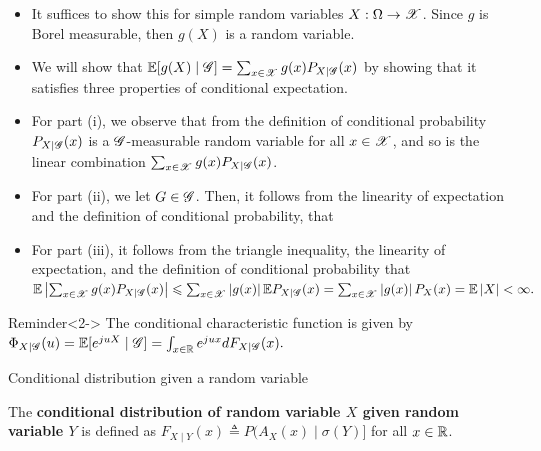 \documentclass[12pt,aspectratio=169]{beamer}
\begin{document}
\begin{frame}
\begin{Proof}
\begin{itemize}
\item <1-> It suffices to show this for simple random variables $X:\Omega\to\mathscr{X}$. 
Since $g$ is Borel measurable, then $g(X)$ is a random variable. 
\item <2-> We will show that $\mathbb{E}[g(X)\mid\mathscr{G}] = \sum_{x\in\mathscr{X}}g(x)P_{X\mid\mathscr{G}}(x)$ by showing that it satisfies three properties of conditional expectation.  
\item <3-> For part (i), we observe that from the definition of conditional probability $P_{X\mid\mathscr{G}}(x)$ is a $\mathscr{G}$-measurable random variable for all $x\in\mathscr{X}$, and so is the linear combination $ \sum_{x\in\mathscr{X}}g(x)P_{X\mid\mathscr{G}}(x)$. 
\item <4-> For part (ii), we let $G \in \mathscr{G}$. 
Then, it follows from the  linearity of expectation and the definition of conditional probability, that 
\end{itemize}
\end{Proof}
\end{frame}

\begin{frame}
\begin{Proof}
\begin{itemize}
\item For part (iii), it follows from the triangle inequality, the linearity of expectation, and the definition of conditional probability that
$
\mathbb{E}\left\lvert\sum_{x\in\mathscr{X}}g(x)P_{X\mid\mathscr{G}}(x)\right\rvert \leqslant \sum_{x\in\mathscr{X}}\left\lvert g(x)\right\rvert \mathbb{E} P_{X\mid\mathscr{G}}(x)
= \sum_{x\in\mathscr{X}}\left\lvert g(x)\right\rvert P_X(x) = \mathbb{E}\left\lvert X\right\rvert < \infty.
$
\end{itemize}
\end{Proof}

\begin{block}{Reminder}<2->
The conditional characteristic function is given by 
$\Phi_{X\mid\mathscr{G}}(u) = \mathbb{E}[e^{juX}\mid\mathscr{G}] = \int_{x\in\mathbb{R}}e^{jux}dF_{X\mid\mathscr{G}}(x).$
\end{block}
\end{frame}

\begin{frame}{Conditional distribution given a random variable}
\begin{Definition}
The \textbf{conditional distribution of random variable $X$ given random variable $Y$} is defined as $F_{X\mid Y}(x) \triangleq P(A_X(x)\mid\sigma(Y)]$ for all $x\in \mathbb{R}$.
\end{Definition}
\end{frame}
\end{document}
